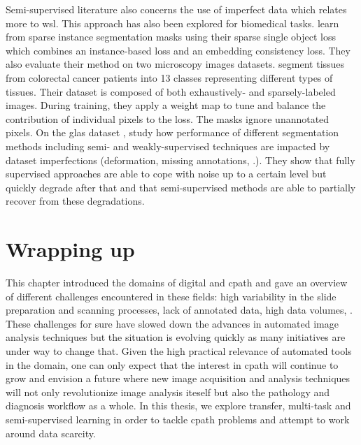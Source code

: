 Semi-supervised literature also concerns the use of imperfect data which relates more to \acrlong{wsl}. This approach has also been explored for biomedical tasks. \citeauthor{wolny2021sparse} \cite{wolny2021sparse} learn from sparse instance segmentation masks using their sparse single object loss which combines an instance-based loss and an embedding consistency loss. They also evaluate their method on two microscopy images datasets. \citeauthor{bokhorst2018learning} \cite{bokhorst2018learning} segment tissues from colorectal cancer patients into 13 classes representing different types of tissues. Their dataset is composed of both exhaustively- and sparsely-labeled images. During training, they apply a weight map to tune and balance the contribution of individual pixels to the loss. The masks ignore unannotated pixels. On the \acrshort{glas} dataset \cite{sirinukunwattana2017gland}, \citeauthor{foucart2019snow} \cite{foucart2019snow} study how performance of different segmentation methods including semi- and weakly-supervised techniques are impacted by dataset imperfections (\eg deformation, missing annotations, \etc.). They show that fully supervised approaches are able to cope with noise up to a certain level but quickly degrade after that and that semi-supervised methods are able to partially recover from these degradations.  

\section{Wrapping up}

This chapter introduced the domains of digital and \acrlong{cpath} and gave an overview of different challenges encountered in these fields: high variability in the slide preparation and scanning processes, lack of annotated data, high data volumes, \etc. These challenges for sure have slowed down the advances in automated image analysis techniques but the situation is evolving quickly as many initiatives are under way to change that. Given the high practical relevance of automated tools in the domain, one can only expect that the interest in \acrlong{cpath} will continue to grow and envision a future where new image acquisition and analysis techniques will not only revolutionize image analysis iteself but also the pathology and diagnosis workflow as a whole. In this thesis, we explore transfer, multi-task and semi-supervised learning in order to tackle \acrlong{cpath} problems and attempt to work around data scarcity.
